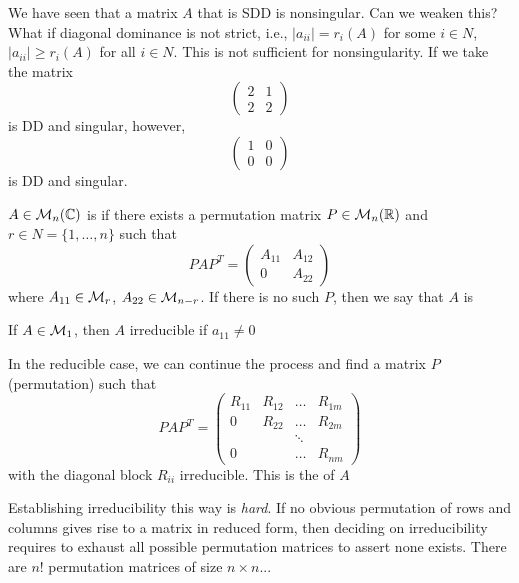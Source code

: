 \documentclass[aspectratio=169]{beamer}
\begin{document}
\begin{frame}
We have seen that a matrix $A$ that is SDD is nonsingular. Can we weaken this? What if diagonal dominance is not strict, i.e., $| a_{ii}| = r_i(A)$ for some $i\in N$, $|a_{ii}| \geq r_i(A)$ for all $i\in N$. This is not sufficient for nonsingularity. If we take the matrix 
\[\begin{pmatrix}
 2&1\\
 2&2
\end{pmatrix}
\]
is DD and singular, however, 
\[
\begin{pmatrix}
 1&0\\
 0&0
\end{pmatrix}
\] 
is DD and singular.
\end{frame}

 
\begin{frame}
\begin{definition}\label{def:irreducible_matrix}
$A\in \mathcal{M}_n(\mathbb{C})$ is  if there exists a permutation matrix $P\in \mathcal{M}_n(\mathbb{R})$ and $r\in N=\{1, \ldots, n\}$ such that 
\[
PAP^T= \begin{pmatrix}
 A_{11}& A_{12}\\
 0& A_{22}
\end{pmatrix}
\]
where $A_{11}\in\mathcal{M}_{r}$, $A_{22}\in\mathcal{M}_{n-r}$. If there is no such $P$, then we say that $A$ is  
\end{definition}
\end{frame}


\begin{frame}
\begin{remark}
If $A\in\mathcal{M}_{1}$, then $A$ irreducible if $a_{11}\neq 0$
\end{remark}
\vfill
 In the reducible case, we can continue the process and find a matrix $P$ (permutation) such that 
 \[PAP^{T}=\begin{pmatrix}
 R_{11}& R_{12}& \ldots & R_{1m}\\
 0& R_{22}& \ldots & R_{2m}\\
 &&\ddots&\\
 0& & \ldots & R_{nm}
 \end{pmatrix}\]
 with the diagonal block $R_{ii}$ irreducible. This is the  of $A$
\end{frame}

\begin{frame}
\begin{remark}
Establishing irreducibility this way is \emph{hard}. If no obvious permutation of rows and columns gives rise to a matrix in reduced form, then deciding on irreducibility requires to exhaust all possible permutation matrices to assert none exists. There are $n!$ permutation matrices of size $n\times n$...
\end{remark}
\end{frame}
\end{document}
